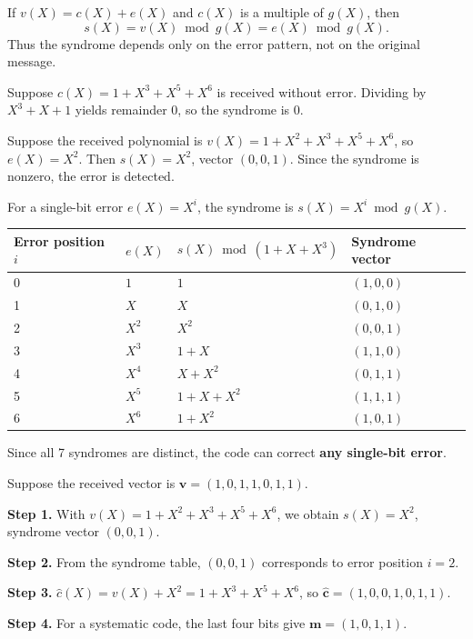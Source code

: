 \begin{note}
If \(v(X)=c(X)+e(X)\) and \(c(X)\) is a multiple of \(g(X)\), then
\[s(X)=v(X) \bmod g(X)=e(X) \bmod g(X).\]
Thus the syndrome depends only on the error pattern, not on the original message.
\end{note}

\begin{example}
Suppose \(c(X)=1+X^3+X^5+X^6\) is received without error. Dividing by \(X^3+X+1\) yields remainder 0, so the syndrome is 0.
\end{example}

\begin{example}
Suppose the received polynomial is \(v(X)=1+X^2+X^3+X^5+X^6\), so \(e(X)=X^2\). Then \(s(X)=X^2\), vector \((0,0,1)\). Since the syndrome is nonzero, the error is detected.
\end{example}

\begin{example}
For a single-bit error \(e(X)=X^i\), the syndrome is \(s(X)=X^i \bmod g(X)\).
\begin{center}
\renewcommand{\arraystretch}{1.2}
\begin{tabular}{@{}p{2.5cm}lp{4cm}l@{}}
	\toprule
	Error position \(i\) & \(e(X)\) & \(s(X)\bmod (1+X+X^3)\) & Syndrome vector \\
	\midrule
	0 & \(1\) & \(1\) & \((1,0,0)\) \\
	1 & \(X\) & \(X\) & \((0,1,0)\) \\
	2 & \(X^2\) & \(X^2\) & \((0,0,1)\) \\
	3 & \(X^3\) & \(1+X\) & \((1,1,0)\) \\
	4 & \(X^4\) & \(X+X^2\) & \((0,1,1)\) \\
	5 & \(X^5\) & \(1+X+X^2\) & \((1,1,1)\) \\
	6 & \(X^6\) & \(1+X^2\) & \((1,0,1)\) \\
	\bottomrule
\end{tabular}
\end{center}
Since all 7 syndromes are distinct, the code can correct \textbf{any single-bit error}.
\end{example}

\begin{example}
Suppose the received vector is \(\mathbf{v}=(1,0,1,1,0,1,1)\).

\textbf{Step 1.} With \(v(X)=1+X^2+X^3+X^5+X^6\), we obtain \(s(X)=X^2\), syndrome vector \((0,0,1)\).

\textbf{Step 2.} From the syndrome table, \((0,0,1)\) corresponds to error position \(i=2\).

\textbf{Step 3.} \(\hat{c}(X)=v(X)+X^2 = 1+X^3+X^5+X^6\), so \(\hat{\mathbf{c}}=(1,0,0,1,0,1,1)\).

\textbf{Step 4.} For a systematic code, the last four bits give \(\mathbf{m}=(1,0,1,1)\).
\end{example}

